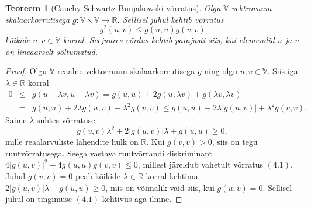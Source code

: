 \documentclass[a4paper,12pt]{article}
\newtheorem{teoreem}{Teoreem}[section]
\numberwithin{equation}{section}
\begin{document}
\begin{teoreem}[Cauchy-Schwartz-Bunjakowski võrratus]
Olgu $\mathbb{V}$ vektroruum skalaarkorrutisega $g : \mathbb{V} \times \mathbb{V} \rightarrow \mathbb{R}$. Sellisel juhul kehtib võrratus
\begin{equation}
g^2 \left(u, v \right) \leq g \left(u, u \right) g \left(v, v \right)
\end{equation}
kõikide $u, v \in \mathbb{V}$ korral. Seejuures võrdus kehtib parajasti siis, kui elemendid $u$ ja $v$ on lineaarselt sõltumatud.
\end{teoreem}

%
%
\begin{proof}
Olgu $\mathbb{V}$ reaalne vektorruum skalaarkorrutisega $g$ ning olgu $u, v \in \mathbb{V}$. Siis iga $\lambda \in \mathbb{R}$ korral
\begin{eqnarray*}
0 &\leq& g\left(u+\lambda v,u+\lambda v\right) = g\left(u,u\right) + 2g\left(u, \lambda v \right) + g\left(\lambda v, \lambda v\right) \\
&=& g\left(u,u\right) + 2\lambda g\left(u, v \right) + \lambda^2 g\left(v,v\right) \leq g\left(u,u\right) + 2\lambda | g\left(u, v \right)| + \lambda^2 g\left(v,v\right).
\end{eqnarray*}
Saime $\lambda$ suhtes võrratuse 
\[ g\left(v,v\right)\lambda^2 + 2|g\left(u, v \right)|\lambda + g\left(u,u\right) \geq 0, \]
mille reaalarvuliste lahendite hulk on $\mathbb{R}$. Kui $g\left(v,v\right) > 0$, siis on tegu ruutvõrratusega. Seega vastava ruutvõrrandi diskriminant $4|g\left(u,v\right)|^2 - 4g\left(u,u\right)g\left(v,v\right) \leq 0$, millest järeldub vahetult võrratus $(4.1)$. Juhul $g\left(v,v\right) = 0$ peab kõikide $\lambda \in \mathbb{R}$ korral kehtima $2|g\left(u,v\right)|\lambda + g\left(u,u\right) \geq 0$, mis on võimalik vaid siis, kui $g\left(u,v\right) = 0$. Sellisel juhul on tingimuse $(4.1)$ kehtivus aga ilmne.

\end{proof}
\end{document}
